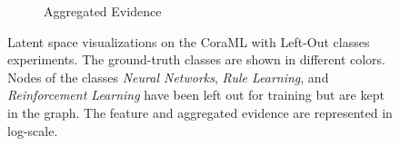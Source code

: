 \begin{figure}[!h]
\begin{subfigure}[t]{\textwidth}
		\caption{Aggregated Evidence}
		\label{subfig:loc-clean-evidence}
	\end{subfigure}
    \caption{Latent space visualizations on the CoraML with Left-Out classes experiments. The ground-truth classes are shown in different colors. Nodes of the classes \emph{Neural Networks}, \emph{Rule Learning}, and \emph{Reinforcement Learning} have been left out for training but are kept in the graph. The feature and aggregated evidence are represented in log-scale.}
    \label{fig:loc-space-gaussian}
\end{figure}